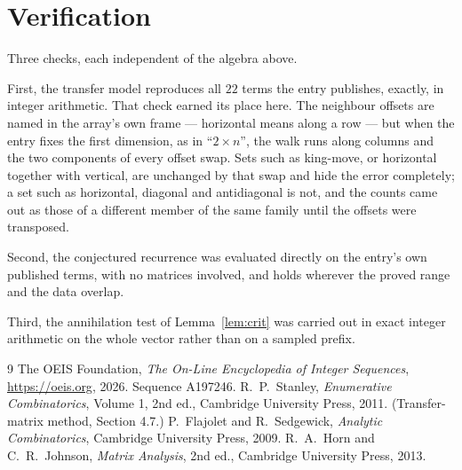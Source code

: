 \documentclass[11pt,a4paper]{article}
\theoremstyle{plain}
\theoremstyle{definition}
\begin{document}
\section{Verification}

Three checks, each independent of the algebra above.

First, the transfer model reproduces all $22$ terms the entry publishes, exactly, in
integer arithmetic. That check earned its place here. The neighbour offsets are named in the
array's own frame --- horizontal means along a row --- but when the entry fixes the first
dimension, as in ``$2\times n$'', the walk runs along columns and the two components of every
offset swap. Sets such as king-move, or horizontal together with vertical, are unchanged by
that swap and hide the error completely; a set such as horizontal, diagonal and antidiagonal
is not, and the counts came out as those of a different member of the same family until the
offsets were transposed.

Second, the conjectured recurrence was evaluated directly on the entry's own published terms,
with no matrices involved, and holds wherever the proved range and the data overlap.

Third, the annihilation test of Lemma~\ref{lem:crit} was carried out in exact integer
arithmetic on the whole vector rather than on a sampled prefix.

\begin{thebibliography}{9}
 The OEIS Foundation, \emph{The On-Line Encyclopedia of Integer
Sequences}, \url{https://oeis.org}, 2026. Sequence A197246.
 R.~P.~Stanley, \emph{Enumerative Combinatorics}, Volume 1, 2nd ed.,
Cambridge University Press, 2011. (Transfer-matrix method, Section 4.7.)
 P.~Flajolet and R.~Sedgewick, \emph{Analytic Combinatorics}, Cambridge
University Press, 2009.
 R.~A.~Horn and C.~R.~Johnson, \emph{Matrix Analysis}, 2nd ed., Cambridge
University Press, 2013.
\end{thebibliography}
\end{document}
